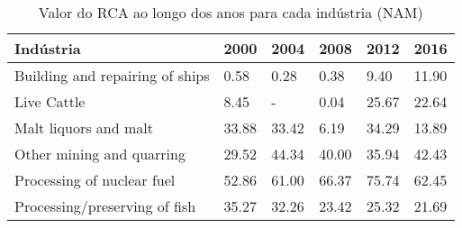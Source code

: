 \begin{table}
\centering
\caption{Valor do RCA ao longo dos anos para cada indústria (NAM)}
\label{tab:ex3-tempo-NAM}
\begin{tabular}{p{6cm}p{1.5cm}p{1.5cm}p{1.5cm}p{1.5cm}p{1.5cm}}
\toprule
                      Indústria &  2000 &  2004 &  2008 &  2012 &  2016 \\
\midrule
Building and repairing of ships &  0.58 &  0.28 &  0.38 &  9.40 & 11.90 \\
                    Live Cattle &  8.45 &     - &  0.04 & 25.67 & 22.64 \\
          Malt liquors and malt & 33.88 & 33.42 &  6.19 & 34.29 & 13.89 \\
      Other mining and quarring & 29.52 & 44.34 & 40.00 & 35.94 & 42.43 \\
     Processing of nuclear fuel & 52.86 & 61.00 & 66.37 & 75.74 & 62.45 \\
  Processing/preserving of fish & 35.27 & 32.26 & 23.42 & 25.32 & 21.69 \\
\bottomrule
\end{tabular}
\end{table}
